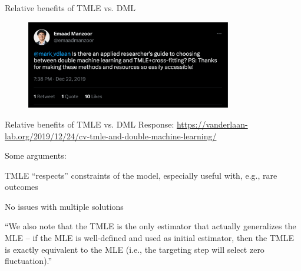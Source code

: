 \documentclass[xcolor={table}]{beamer}
\begin{document}
\begin{frame}{Relative benefits of TMLE vs. DML}

\begin{figure}
\centering
\includegraphics[width = 0.8\textwidth]{../assets/tmle-dml-empirical-tweet.png}
\end{figure}
\hfill
\end{frame}


\begin{frame}{Relative benefits of TMLE vs. DML}
Response: \url{https://vanderlaan-lab.org/2019/12/24/cv-tmle-and-double-machine-learning/}\pause

Some arguments: \pause
\begin{wideitemize}
\item TMLE ``respects'' constraints of the model, especially useful with, e.g., rare outcomes \citep{balzer2016estimating}\pause
\item No issues with multiple solutions\pause
\item ``We also note that the TMLE is the only estimator that actually generalizes the MLE – if the MLE is well-defined and used as initial estimator, then the TMLE is exactly equivalent to the MLE (i.e., the targeting step will select zero fluctuation).'' 
\end{wideitemize}

\end{frame}


\end{document}
